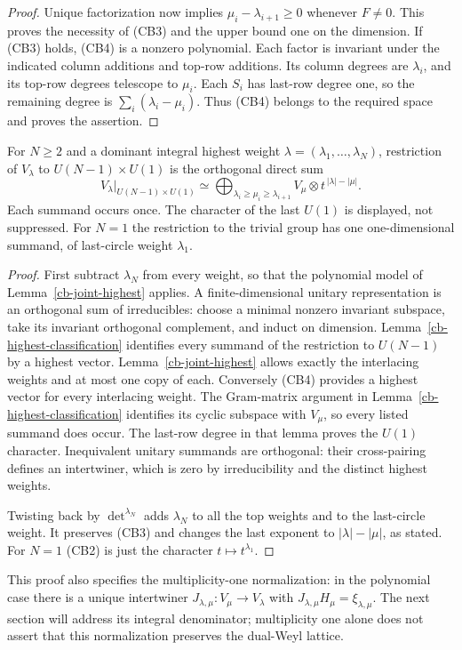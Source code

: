 \begin{proof}
Unique factorization now implies
$\mu_i-\lambda_{i+1}\ge0$ whenever $F\ne0$.
This proves the necessity of (CB3) and the upper bound
one on the dimension.  If (CB3) holds, (CB4) is a
nonzero polynomial.  Each factor is invariant under
the indicated column additions and top-row additions.
Its column degrees are $\lambda_i$, and its top-row
degrees telescope to $\mu_i$.
Each $S_i$ has last-row degree one, so the remaining
degree is $\sum_i(\lambda_i-\mu_i)$.
Thus (CB4) belongs to the required space and proves
the assertion.
\end{proof}

\begin{theorem}\label{ib-compact-branching}
For $N\ge2$ and a dominant integral highest weight
$\lambda=(\lambda_1,\ldots,\lambda_N)$, restriction
of $V_\lambda$ to $U(N-1)\times U(1)$ is the orthogonal
direct sum
\[
 V_\lambda\big|_{U(N-1)\times U(1)}
     \simeq\bigoplus_{\lambda_i\ge\mu_i\ge\lambda_{i+1}}
                           V_\mu\otimes t^{\,|\lambda|-|\mu|}.
 \tag{CB7}
\]
Each summand occurs once.  The character of the last
$U(1)$ is displayed, not suppressed.  For $N=1$ the
restriction to the trivial group has one one-dimensional
summand, of last-circle weight $\lambda_1$.
\end{theorem}
\begin{proof}
First subtract $\lambda_N$ from every weight, so that
the polynomial model of Lemma~\ref{cb-joint-highest}
applies.  A finite-dimensional unitary representation
is an orthogonal sum of irreducibles: choose a minimal
nonzero invariant subspace, take its invariant orthogonal
complement, and induct on dimension.
Lemma~\ref{cb-highest-classification} identifies every
summand of the restriction to $U(N-1)$ by a highest
vector.  Lemma~\ref{cb-joint-highest} allows exactly
the interlacing weights and at most one copy of each.
Conversely (CB4) provides a highest vector for every
interlacing weight.  The Gram-matrix argument in
Lemma~\ref{cb-highest-classification} identifies its
cyclic subspace with $V_\mu$, so every listed summand
does occur.  The last-row degree in that lemma proves
the $U(1)$ character.  Inequivalent unitary summands
are orthogonal: their cross-pairing defines an
intertwiner, which is zero by irreducibility and the
distinct highest weights.

Twisting back by $\det^{\lambda_N}$ adds $\lambda_N$
to all the top weights and to the last-circle weight.
It preserves (CB3) and changes the last exponent to
$|\lambda|-|\mu|$, as stated.  For $N=1$ (CB2) is
just the character $t\mapsto t^{\lambda_1}$.
\end{proof}

This proof also specifies the multiplicity-one normalization:
in the polynomial case there is a unique intertwiner
$J_{\lambda,\mu}:V_\mu\to V_\lambda$ with
$J_{\lambda,\mu}H_\mu=\xi_{\lambda,\mu}$.
The next section will address its integral denominator;
multiplicity one alone does not assert that this
normalization preserves the dual-Weyl lattice.


